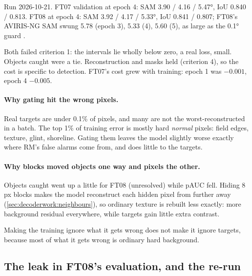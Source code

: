 \begin{drift}
Run 2026-10-21. FT07 validation at epoch 4: SAM 3.90 / 4.16 / 5.47°, IoU 0.840 / 0.813. FT08 at epoch 4: SAM
3.92 / 4.17 / 5.33°, IoU 0.841 / 0.807; FT08's AVIRIS-NG SAM swung 5.78 (epoch 3), 5.33 (4), 5.60 (5), as large as
the 0.1° guard .
\end{drift}

Both failed criterion 1: the intervals lie wholly below zero, a real loss, small. Objects caught were a tie.
Reconstruction and masks held (criterion 4), so the cost is specific to detection. FT07's cost grew with
training: epoch 1 was $-0.001$, epoch 4 $-0.005$.

\paragraph{Why gating hit the wrong pixels.} Real targets are under 0.1\% of pixels, and many are not the
worst-reconstructed in a batch. The top 1\% of training error is mostly hard \emph{normal} pixels: field edges,
texture, glint, shoreline. Gating them leaves the model slightly worse exactly where RM's false alarms come
from, and does little to the targets.

\paragraph{Why blocks moved objects one way and pixels the other.} Objects caught went up a little for FT08
(unresolved) while pAUC fell. Hiding 8\,px blocks makes the model reconstruct each hidden pixel from further away
(\cref{sec:decoderwork:neighbours}), so ordinary texture is rebuilt less exactly: more background residual
everywhere, while targets gain little extra contrast.

\begin{keypoint}
Making the training ignore what it gets wrong does not make it ignore targets, because most of what it gets
wrong is ordinary hard background.
\end{keypoint}

\subsection{The leak in FT08's evaluation, and the re-run}\label{sec:decoderwork:leak}

